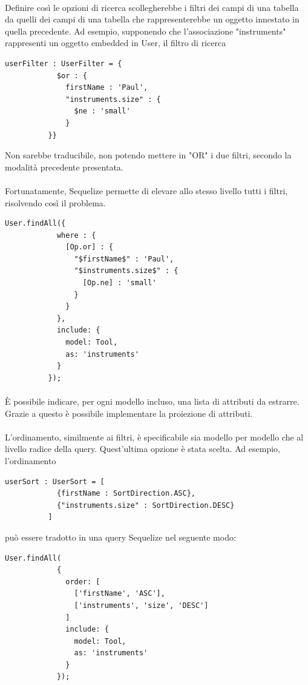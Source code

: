\documentclass[a4paper, 12pt]{report}
\begin{document}
        \paragraph*{}
        Definire così le opzioni di ricerca scollegherebbe i filtri dei campi di una tabella da quelli dei campi di una tabella che rappresenterebbe un oggetto innestato in quella precedente.
        Ad esempio, supponendo che l'associazione "instruments" rappresenti un oggetto embedded in User, il filtro di ricerca
        \begin{Verbatim}[samepage=true]
          userFilter : UserFilter = {
            $or : {
              firstName : 'Paul', 
              "instruments.size" : {
                $ne : 'small'
              }
          }}
        \end{Verbatim}
        Non sarebbe traducibile, non potendo mettere in "OR" i due filtri, secondo la modalità precedente presentata.
        \paragraph*{} 
        Fortunatamente, Sequelize permette di elevare allo stesso livello tutti i filtri, risolvendo così il problema.
        \begin{Verbatim}[samepage=true]
          User.findAll({
            where : {
              [Op.or] : {
                "$firstName$" : 'Paul', 
                "$instruments.size$" : {
                  [Op.ne] : 'small'
                }
              }
            },
            include: {
              model: Tool,
              as: 'instruments'
            }
          });
        \end{Verbatim}
        \paragraph*{}
        È possibile indicare, per ogni modello incluso, una lista di attributi da estrarre. Grazie a questo è possibile implementare la proiezione di attributi.
        \paragraph*{}
        L'ordinamento, similmente ai filtri, è specificabile sia modello per modello che al livello radice della query. Quest'ultima opzione è stata scelta.
        Ad esempio, l'ordinamento
        \begin{Verbatim}[samepage=true]
          userSort : UserSort = [
            {firstName : SortDirection.ASC},
            {"instruments.size" : SortDirection.DESC}
          ]
        \end{Verbatim}
        può essere tradotto in una query Sequelize nel seguente modo:
        \begin{Verbatim}[samepage=true]
          User.findAll(
            {
              order: [
                ['firstName', 'ASC'],
                ['instruments', 'size', 'DESC']
              ]
              include: {
                model: Tool,
                as: 'instruments'
              }
            });
        \end{Verbatim}
\end{document}
